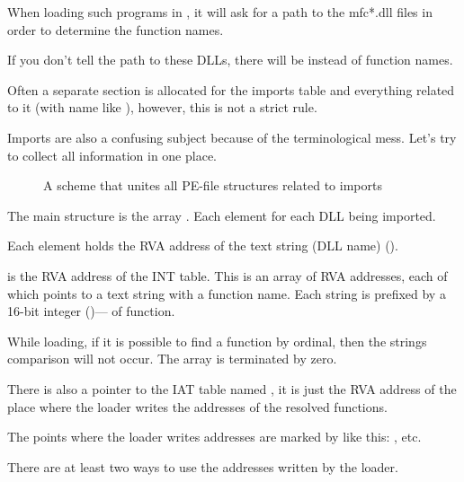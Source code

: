 When loading such programs in \IDA, it will ask for a path to the mfc*.dll files
in order to determine the function names.

If you don't tell \IDA the path to these DLLs, there will be  instead of function names.


Often a separate section is allocated for the imports table and everything related to it (with name like ),
however, this is not a strict rule.

Imports are also a confusing subject because of the terminological mess. Let's try to collect all information in one place.

\begin{figure}[H]
\centering
{}
\caption{
A scheme that unites all PE-file structures related to imports}
\end{figure}

The main structure is the array .
Each element for each DLL being imported.

Each element holds the \ac{RVA} address of the text string (DLL name) ().

 is the \ac{RVA} address of the \ac{INT} table. 
This is an array of \ac{RVA} addresses, each of which points to a text string with a function name. 
Each string is prefixed by a 16-bit integer 
()--- of function.

While loading, if it is possible to find a function by ordinal,
then the strings comparison will not occur. The array is terminated by zero.

There is also a pointer to the \ac{IAT} table named , it is just the \ac{RVA} address 
of the place where the loader writes the addresses of the resolved functions.

The points where the loader writes addresses are marked by \IDA like this: , etc.

There are at least two ways to use the addresses written by the loader.


